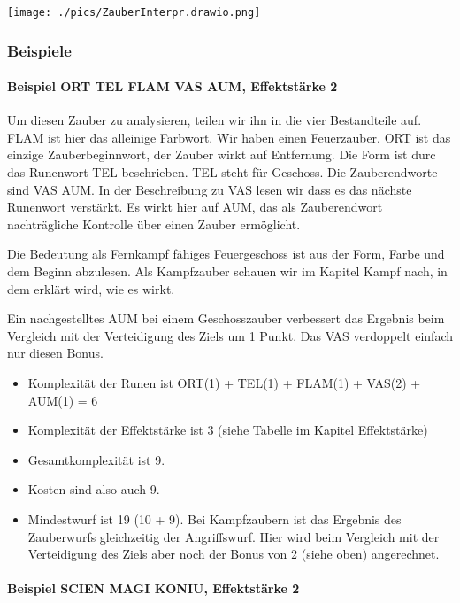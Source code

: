 \documentclass{article}
\begin{document}
\texttt{[image: ./pics/ZauberInterpr.drawio.png]}

\subsubsection{Beispiele}

\paragraph{Beispiel ORT TEL FLAM VAS AUM, Effektstärke 2}

Um diesen Zauber zu analysieren, teilen wir ihn in die vier Bestandteile auf. FLAM ist hier das alleinige Farbwort.
Wir haben einen Feuerzauber. ORT ist das einzige Zauberbeginnwort, der Zauber wirkt auf Entfernung. Die Form ist durc
das Runenwort TEL beschrieben. TEL steht für Geschoss. Die Zauberendworte sind VAS AUM. In der Beschreibung zu VAS
lesen wir dass es das nächste Runenwort verstärkt. Es wirkt hier auf AUM, das als Zauberendwort nachträgliche
Kontrolle über einen Zauber ermöglicht.

Die Bedeutung als Fernkampf fähiges Feuergeschoss ist aus der Form, Farbe und dem Beginn abzulesen. Als Kampfzauber
schauen wir im Kapitel Kampf nach, in dem erklärt wird, wie es wirkt.

Ein nachgestelltes AUM bei einem Geschosszauber verbessert das Ergebnis beim Vergleich mit der Verteidigung des Ziels
um 1 Punkt. Das VAS verdoppelt einfach nur diesen Bonus.

\begin{itemize}
\item Komplexität der Runen ist ORT(1) + TEL(1) + FLAM(1) + VAS(2) + AUM(1) = 6
\item Komplexität der Effektstärke ist 3 (siehe Tabelle im Kapitel Effektstärke)
\item Gesamtkomplexität ist 9.
\item Kosten sind also auch 9.
\item Mindestwurf ist 19 (10 + 9). Bei Kampfzaubern ist das Ergebnis des Zauberwurfs gleichzeitig der Angriffswurf. Hier wird beim Vergleich mit der Verteidigung des Ziels aber noch der Bonus von 2 (siehe oben) angerechnet.
\end{itemize}

\paragraph{Beispiel SCIEN MAGI KONIU, Effektstärke 2}
\end{document}

